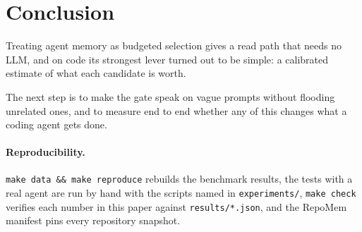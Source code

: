 \section{Conclusion}

Treating agent memory as budgeted selection gives a read path that needs no LLM, and on code its strongest lever turned out to be simple: a calibrated estimate of what each candidate is worth. \conclusionsummary{}

The next step is to make the gate speak on vague prompts without flooding unrelated ones, and to measure end to end whether any of this changes what a coding agent gets done.

\paragraph{Reproducibility.} \texttt{make data \&\& make reproduce} rebuilds the benchmark results, the tests with a real agent are run by hand with the scripts named in \texttt{experiments/}, \texttt{make check} verifies each number in this paper against \texttt{results/*.json}, and the RepoMem manifest pins every repository snapshot.
